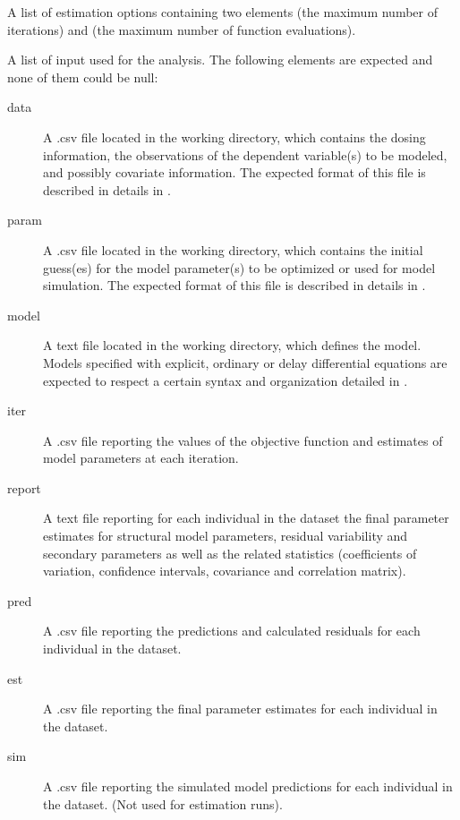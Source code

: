 \begin{Arguments}
\begin{ldescription}
\item[\code{estim.options}] A list of estimation options containing two elements
 (the maximum number of iterations) and  (the
maximum number of function evaluations).

\item[\code{files}] A list of input used for the analysis. The following elements are
expected and none of them could be null: \begin{description}

\item[data] A .csv file located in the working directory, which contains
the dosing information, the observations of the dependent variable(s)
to be modeled, and possibly covariate information. The expected format 
of this file is described in details in .
\item[param] A .csv file located in the working directory, which contains
the initial guess(es) for the model parameter(s) to be optimized or used
for model simulation. The expected format of this file is described in
details in .
\item[model] A text file located in the working directory, which defines 
the model. Models specified with explicit, ordinary or delay 
differential equations are expected to respect a certain syntax and 
organization detailed in .
\item[iter] A .csv file reporting the values of the objective function
and estimates of model parameters at each iteration.
\item[report] A text file reporting for each individual in the dataset the
final parameter estimates for structural model parameters, residual 
variability and secondary parameters as well as the related statistics 
(coefficients of variation, confidence intervals, covariance and 
correlation matrix).
\item[pred] A .csv file reporting the predictions and calculated residuals
for each individual in the dataset.
\item[est] A .csv file reporting the final parameter estimates for each
individual in the dataset.
\item[sim] A .csv file reporting the simulated model predictions for each 
individual in the dataset. (Not used for estimation runs).

\end{description}


\end{ldescription}
\end{Arguments}
